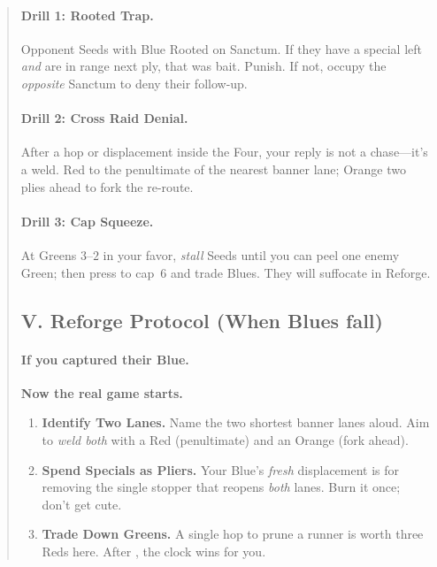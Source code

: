 \documentclass[11pt]{article}
\newcommand{\CapC}[1]{\textcolor{green!40!black}{\scriptsize\ttfamily[G:#1]}}
\begin{document}
\begin{quote}
\paragraph{Drill 1: Rooted Trap.} Opponent Seeds with Blue Rooted on Sanctum. If they have a special left \emph{and} are in range next ply, that was bait. Punish. If not, occupy the \emph{opposite} Sanctum to deny their follow-up.
\paragraph{Drill 2: Cross Raid Denial.} After a hop or displacement inside the Four, your reply is not a chase—it's a weld. Red to the penultimate of the nearest banner lane; Orange two plies ahead to fork the re-route.
\paragraph{Drill 3: Cap Squeeze.} At Greens $3$–$2$ in your favor, \emph{stall} Seeds until you can peel one enemy Green; then press to cap~6 and trade Blues. They will suffocate in Reforge.

\subsection{V. Reforge Protocol (When Blues fall)}
\paragraph{If you captured their Blue.} \textbf{Now the real game starts.}
\begin{enumerate}\itemsep0.25em
  \item \textbf{Identify Two Lanes.} Name the two shortest banner lanes aloud. Aim to \emph{weld both} with a Red (penultimate) and an Orange (fork ahead).
  \item \textbf{Spend Specials as Pliers.} Your Blue’s \emph{fresh} displacement is for removing the single stopper that reopens \emph{both} lanes. Burn it once; don’t get cute.
  \item \textbf{Trade Down Greens.} A single hop to prune a runner is worth three Reds here. After \CapC{2--0}, the clock wins for you.
\end{enumerate}

\end{quote}
\end{document}
